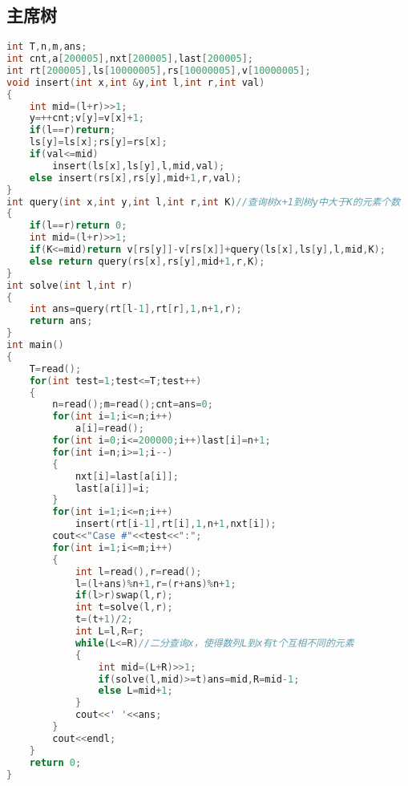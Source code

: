 \subsection{主席树}
\begin{lstlisting}[language=C]
int T,n,m,ans;
int cnt,a[200005],nxt[200005],last[200005];
int rt[200005],ls[10000005],rs[10000005],v[10000005];
void insert(int x,int &y,int l,int r,int val)
{
    int mid=(l+r)>>1;
    y=++cnt;v[y]=v[x]+1;
    if(l==r)return;
    ls[y]=ls[x];rs[y]=rs[x];
    if(val<=mid)
        insert(ls[x],ls[y],l,mid,val);
    else insert(rs[x],rs[y],mid+1,r,val);
}
int query(int x,int y,int l,int r,int K)//查询树x+1到树y中大于K的元素个数
{
    if(l==r)return 0;
    int mid=(l+r)>>1;
    if(K<=mid)return v[rs[y]]-v[rs[x]]+query(ls[x],ls[y],l,mid,K);
    else return query(rs[x],rs[y],mid+1,r,K);
}
int solve(int l,int r)
{
    int ans=query(rt[l-1],rt[r],1,n+1,r);
    return ans;
}
int main()
{
    T=read();
    for(int test=1;test<=T;test++)
    {
        n=read();m=read();cnt=ans=0;
        for(int i=1;i<=n;i++)
            a[i]=read();
        for(int i=0;i<=200000;i++)last[i]=n+1;
        for(int i=n;i>=1;i--)
        {
            nxt[i]=last[a[i]];
            last[a[i]]=i;
        }
        for(int i=1;i<=n;i++)
            insert(rt[i-1],rt[i],1,n+1,nxt[i]);
        cout<<"Case #"<<test<<":";
        for(int i=1;i<=m;i++)
        {
            int l=read(),r=read();
            l=(l+ans)%n+1,r=(r+ans)%n+1;
            if(l>r)swap(l,r);
            int t=solve(l,r);
            t=(t+1)/2;
            int L=l,R=r;
            while(L<=R)//二分查询x，使得数列L到x有t个互相不同的元素
            {
                int mid=(L+R)>>1;
                if(solve(l,mid)>=t)ans=mid,R=mid-1;
                else L=mid+1;
            }
            cout<<' '<<ans;
        }
        cout<<endl;
    }
    return 0;
}
\end{lstlisting} 
